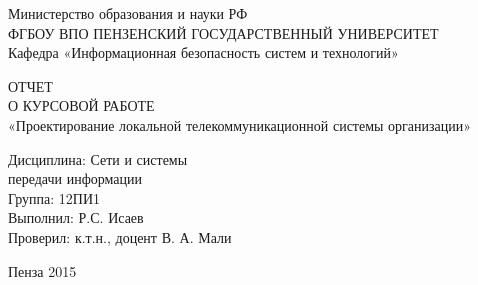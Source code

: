 \begin{titlepage}
  
\begin{centering}
  Министерство образования и науки РФ\\
  ФГБОУ ВПО ПЕНЗЕНСКИЙ ГОСУДАРСТВЕННЫЙ УНИВЕРСИТЕТ\\
  Кафедра «Информационная безопасность систем и технологий»\\
  
  \vfill

  ОТЧЕТ\\
  О КУРСОВОЙ РАБОТЕ\\
  «Проектирование локальной телекоммуникационной системы организации»\\
\end{centering}

\vfill

\begin{flushleft}
  \hspace{9cm}Дисциплина: Сети и системы\\
  \hspace{9cm}передачи информации\\
  \hspace{9cm}Группа: 12ПИ1\\
  \hspace{9cm}Выполнил: Р.С. Исаев\\
  \hspace{9cm}Проверил: к.т.н., доцент В. А. Мали\\
\end{flushleft}

\vfill

\centerline{Пенза 2015}
\end{titlepage}
\setcounter{page}{2}
